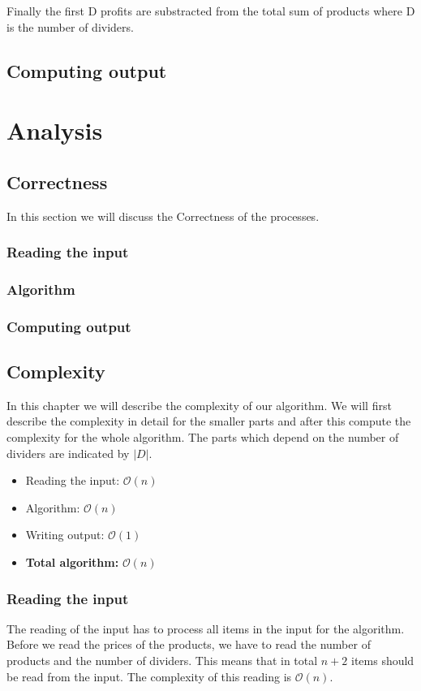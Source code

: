 \documentclass{article}
\newcommand{\bigO}[1]{\mathcal{O}(#1)}
\begin{document}
Finally the first D profits are substracted from the total sum of products where D is the number of dividers.

\subsection{Computing output}

\newpage
\section{Analysis}

\subsection{Correctness}
In this section we will discuss the Correctness of the processes.

\subsubsection{Reading the input}

\subsubsection{Algorithm}

\subsubsection{Computing output}

\subsection{Complexity}
In this chapter we will describe the complexity of our algorithm. We will first describe the complexity in detail for the smaller parts and after this compute the complexity for the whole algorithm. The parts which depend on the number of dividers are indicated by $|D|$.

\begin{itemize}
  \item Reading the input: $\bigO{n}$
  \item Algorithm: $\bigO{n}$
  \item Writing output: $\bigO{1}$
  \item \textbf{Total algorithm:} $\bigO{n}$
\end{itemize}

\subsubsection{Reading the input}
The reading of the input has to process all items in the input for the algorithm. Before we read the prices of the products, we have to read the number of products and the number of dividers. This means that in total $n + 2$ items should be read from the input. The complexity of this reading is $\bigO{n}$.
\end{document}
